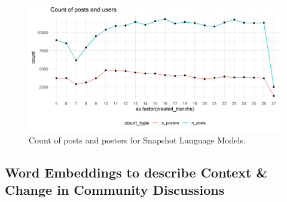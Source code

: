 \begin{figure}[t]%

    \centering

    \includegraphics[width=\linewidth]{figures/sub_ts.png}
    \caption{Count of posts and posters for Snapshot Language Models.}%

    \label{fig:sub_stats}%

\end{figure}





\subsection*{Word Embeddings to describe Context \& Change in Community Discussions}

